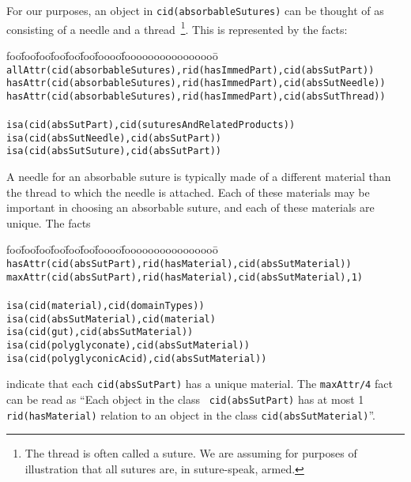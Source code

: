 \begin{example} \rm  \label{ex:maxAttr}
For our purposes, an object in {\tt cid(absorbableSutures)} can be
thought of as consisting of a needle and a thread~\footnote{The thread
is often called a suture.  We are assuming for purposes of
illustration that all sutures are, in suture-speak, armed.}.  This is
represented by the facts:
%
{\small
\begin{tabbing}
foo\=foo\=foo\=foo\=foo\=foo\=foooo\=foooooooooooooooo\=\kill
\> {\tt allAttr(cid(absorbableSutures),rid(hasImmedPart),cid(absSutPart)) } \\
\> {\tt hasAttr(cid(absorbableSutures),rid(hasImmedPart),cid(absSutNeedle)) } \\
\> {\tt hasAttr(cid(absorbableSutures),rid(hasImmedPart),cid(absSutThread)) } \\
\\
\> {\tt isa(cid(absSutPart),cid(suturesAndRelatedProducts))}  \\
\> \> {\tt isa(cid(absSutNeedle),cid(absSutPart)) } \\
\> \> {\tt isa(cid(absSutSuture),cid(absSutPart)) } 
\end{tabbing}
}
%
\noindent
A needle for an absorbable suture is typically made of a different
material than the thread to which the needle is attached.  Each of
these materials may be important in choosing an absorbable suture, and
each of these materials are unique.  The facts
%
{\small
\begin{tabbing}
foo\=foo\=foo\=foo\=foo\=foo\=foooo\=foooooooooooooooo\=\kill
\> {\tt hasAttr(cid(absSutPart),rid(hasMaterial),cid(absSutMaterial)) } \\
\> {\tt maxAttr(cid(absSutPart),rid(hasMaterial),cid(absSutMaterial),1) } \\
\\
\> {\tt isa(cid(material),cid(domainTypes))} \\
\> {\tt isa(cid(absSutMaterial),cid(material)} \\
\> {\tt isa(cid(gut),cid(absSutMaterial))} \\
\> {\tt isa(cid(polyglyconate),cid(absSutMaterial))} \\
\> {\tt isa(cid(polyglyconicAcid),cid(absSutMaterial)) } 
\end{tabbing}
}
%
\noindent
indicate that each {\tt cid(absSutPart)} has a unique material.  The
{\tt maxAttr/4} fact can be read as ``Each object in the class {\tt
cid(absSutPart)} has at most 1 {\tt rid(hasMaterial)} relation to an
object in the class {\tt cid(absSutMaterial)}''.
\end{example}

